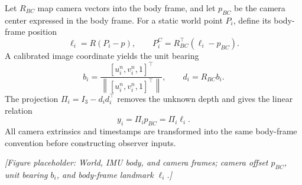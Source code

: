 \documentclass[a4paper,runningheads,twocolumn]{llncs}
\newcommand{\norm}[1]{\left\lVert #1\right\rVert}
\newcommand{\placeholder}[1]{\par\smallskip\noindent\textit{[Figure placeholder: #1]}\par\smallskip}
\begin{document}
Let $R_{BC}$ map camera vectors into the body frame, and let $p_{BC}$ be the camera center expressed in the body frame. For a static world point $P_i$, define its body-frame position
\begin{equation}
 \ell_i=R(P_i-p),\qquad
 P_i^C=R_{BC}^{\top}(\ell_i-p_{BC}).
 \label{eq:pointframes}
\end{equation}
A calibrated image coordinate yields the unit bearing
\begin{equation}
 b_i=\frac{[u_i^{n},v_i^{n},1]^\top}
 {\norm{[u_i^{n},v_i^{n},1]^\top}},\qquad d_i=R_{BC}b_i .
\end{equation}
The projection $\Pi_i=I_3-d_id_i^\top$ removes the unknown depth and gives the linear relation
\begin{equation}
 y_i=\Pi_i p_{BC}=\Pi_i\ell_i .
 \label{eq:bearing}
\end{equation}
All camera extrinsics and timestamps are transformed into the same body-frame convention before constructing observer inputs.
\placeholder{World, IMU body, and camera frames; camera offset $p_{BC}$, unit bearing $b_i$, and body-frame landmark $\ell_i$.}
\end{document}
